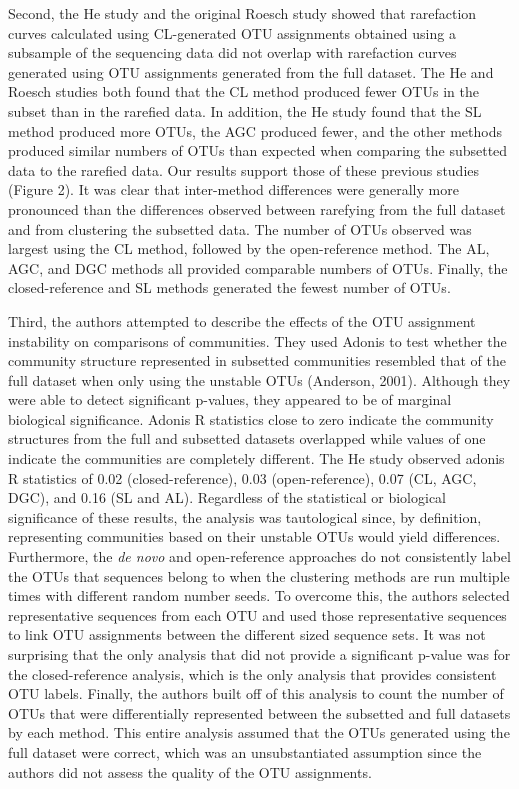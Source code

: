 \documentclass[11pt,]{article}
\begin{document}
Second, the He study and the original Roesch study showed that
rarefaction curves calculated using CL-generated OTU assignments
obtained using a subsample of the sequencing data did not overlap with
rarefaction curves generated using OTU assignments generated from the
full dataset. The He and Roesch studies both found that the CL method
produced fewer OTUs in the subset than in the rarefied data. In
addition, the He study found that the SL method produced more OTUs, the
AGC produced fewer, and the other methods produced similar numbers of
OTUs than expected when comparing the subsetted data to the rarefied
data. Our results support those of these previous studies (Figure 2). It
was clear that inter-method differences were generally more pronounced
than the differences observed between rarefying from the full dataset
and from clustering the subsetted data. The number of OTUs observed was
largest using the CL method, followed by the open-reference method. The
AL, AGC, and DGC methods all provided comparable numbers of OTUs.
Finally, the closed-reference and SL methods generated the fewest number
of OTUs.

Third, the authors attempted to describe the effects of the OTU
assignment instability on comparisons of communities. They used Adonis
to test whether the community structure represented in subsetted
communities resembled that of the full dataset when only using the
unstable OTUs (Anderson, 2001). Although they were able to detect
significant p-values, they appeared to be of marginal biological
significance. Adonis R statistics close to zero indicate the community
structures from the full and subsetted datasets overlapped while values
of one indicate the communities are completely different. The He study
observed adonis R statistics of 0.02 (closed-reference), 0.03
(open-reference), 0.07 (CL, AGC, DGC), and 0.16 (SL and AL). Regardless
of the statistical or biological significance of these results, the
analysis was tautological since, by definition, representing communities
based on their unstable OTUs would yield differences. Furthermore, the
\emph{de novo} and open-reference approaches do not consistently label
the OTUs that sequences belong to when the clustering methods are run
multiple times with different random number seeds. To overcome this, the
authors selected representative sequences from each OTU and used those
representative sequences to link OTU assignments between the different
sized sequence sets. It was not surprising that the only analysis that
did not provide a significant p-value was for the closed-reference
analysis, which is the only analysis that provides consistent OTU
labels. Finally, the authors built off of this analysis to count the
number of OTUs that were differentially represented between the
subsetted and full datasets by each method. This entire analysis assumed
that the OTUs generated using the full dataset were correct, which was
an unsubstantiated assumption since the authors did not assess the
quality of the OTU assignments.
\end{document}
